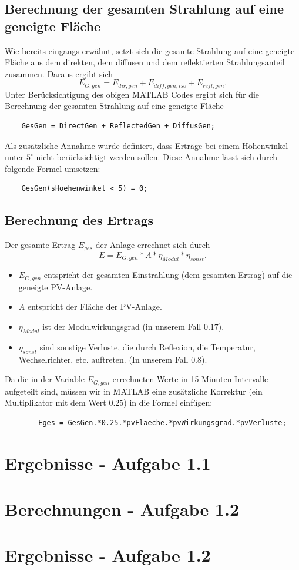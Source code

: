 \documentclass[a4paper,12pt]{article}
\begin{document}
	\subsection{Berechnung der gesamten Strahlung auf eine geneigte Fläche}
	Wie bereits eingangs erwähnt, setzt sich die gesamte Strahlung auf eine geneigte Fläche aus dem direkten, dem diffusen und dem reflektierten Strahlungsanteil zusammen.\newline
	Daraus ergibt sich
	\begin{equation}
		E_{G,gen}=E_{dir,gen}+E_{diff,gen,iso}+E_{refl,gen}.
	\end{equation}
	Unter Berücksichtigung des obigen MATLAB Codes ergibt sich für die Berechnung der gesamten Strahlung auf eine geneigte Fläche
	\begin{lstlisting}
	GesGen = DirectGen + ReflectedGen + DiffusGen;
	\end{lstlisting}
	Als zusätzliche Annahme wurde definiert, dass Erträge bei einem Höhenwinkel unter $5^{\circ}$ nicht berücksichtigt werden sollen.\newline
	Diese Annahme lässt sich durch folgende Formel umsetzen:
	\begin{lstlisting}
	GesGen(sHoehenwinkel < 5) = 0;
	\end{lstlisting}
	\subsection{Berechnung des Ertrags}
	Der gesamte Ertrag $E_{ges}$ der Anlage errechnet sich durch
	\begin{equation}
		E=E_{G,gen}*A*\eta_{Modul}*\eta_{sonst}.
	\end{equation}
	\begin{itemize}
		\item \textbf{$E_{G,gen}$} entspricht der gesamten Einstrahlung (dem gesamten Ertrag) auf die geneigte PV-Anlage.
		\item \textbf{$A$} entspricht der Fläche der PV-Anlage.
		\item \textbf{$\eta_{Modul}$} ist der Modulwirkungsgrad (in unserem Fall $0.17$).
		\item \textbf{$\eta_{sonst}$} sind sonstige Verluste, die durch Reflexion, die Temperatur, Wechselrichter, etc. auftreten. (In unserem Fall $0.8$).
	\end{itemize}
	Da die in der Variable $E_{G,gen}$ errechneten Werte in 15 Minuten Intervalle aufgeteilt sind, müssen wir in MATLAB eine zusätzliche Korrektur (ein Multiplikator mit dem Wert $0.25$) in die Formel einfügen:
	\begin{lstlisting}
		Eges = GesGen.*0.25.*pvFlaeche.*pvWirkungsgrad.*pvVerluste;
	\end{lstlisting}
	\newpage
	\section{Ergebnisse - Aufgabe 1.1}
	\section{Berechnungen - Aufgabe 1.2}
	\section{Ergebnisse - Aufgabe 1.2}
\end{document}
